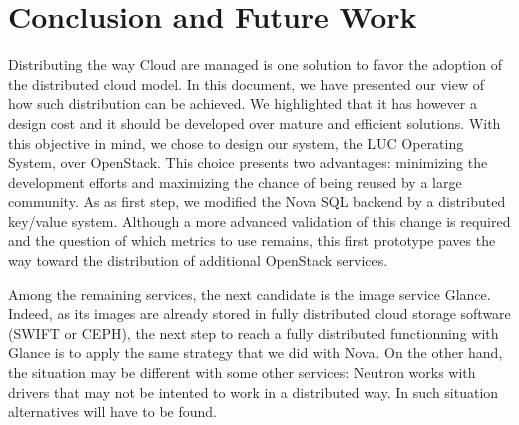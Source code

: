 \section{Conclusion and Future Work\label{sec:con}}
\label{sec:conclusion}
Distributing the way Cloud are managed is one solution to favor the
adoption of the distributed cloud model.
%
In this document, we have presented our view of how such distribution can
be achieved. We highlighted that it has however a design cost and it
should be developed over mature and efficient solutions. With this
objective in mind, we chose to design our system, the LUC Operating
System, over OpenStack. This choice presents two advantages: minimizing the development
efforts and maximizing the chance
of being reused by a large community.
As as first step, we modified the Nova SQL backend by a
distributed key/value system.
Although a more advanced validation of this
change is required and the question of which metrics to use remains,
this first prototype paves the way toward the distribution of
additional OpenStack services.


Among the remaining services, the next candidate
is the image service Glance. Indeed, as its images are already stored in fully distributed cloud storage
software (SWIFT or CEPH), the
next step to reach a fully distributed functionning with Glance is to apply the same
strategy that we did with Nova. On the other hand, the situation may be different with
some other services: Neutron works with drivers that may not be intented to work in a
distributed way.  In such situation alternatives will have to be
found.
%

